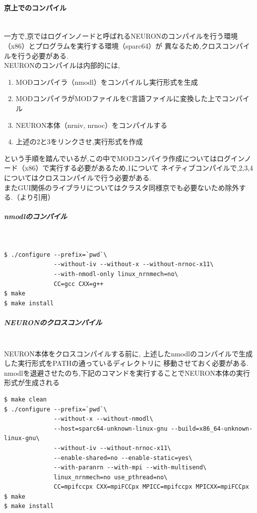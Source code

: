 \paragraph{京上でのコンパイル}~\\
一方で,京ではログインノードと呼ばれるNEURONのコンパイルを行う環境（x86）とプログラムを実行する環境（sparc64）が
異なるため,クロスコンパイルを行う必要がある.\\
NEURONのコンパイルは内部的には,
\begin{enumerate}
\item MODコンパイラ（nmodl）をコンパイルし実行形式を生成
\item MODコンパイラがMODファイルをC言語ファイルに変換した上でコンパイル
\item NEURON本体（nrniv, nrnoc）をコンパイルする
\item 上述の2と3をリンクさせ,実行形式を作成
\end{enumerate}
という手順を踏んでいるが,この中でMODコンパイラ作成についてはログインノード（x86）で実行する必要があるため,1について
ネイティブコンパイルで,2,3,4についてはクロスコンパイルで行う必要がある.\\
またGUI関係のライブラリについてはクラスタ同様京でも必要ないため除外する.（\cite{miyamoto-master}より引用）\\
\subparagraph{nmodlのコンパイル}~\\
{\footnotesize
\begin{lstlisting}[caption=京でのnmodlのコンパイル,label=k-nmodl-compile,numbers=none]
$ ./configure --prefix=`pwd`\
              --without-iv --without-x --without-nrnoc-x11\
              --with-nmodl-only linux_nrnmech=no\
              CC=gcc CXX=g++
$ make
$ make install
\end{lstlisting}
}
\subparagraph{NEURONのクロスコンパイル}~\\
NEURON本体をクロスコンパイルする前に, 上述したnmodlのコンパイルで生成した実行形式をPATHの通っているディレクトリに
移動させておく必要がある. nmodlを退避させたのち,下記のコマンドを実行することでNEURON本体の実行形式が生成される
{\footnotesize
\begin{lstlisting}[caption=京でのNEURON本体のコンパイル,label=k-neuron-compile,numbers=none]
$ make clean
$ ./configure --prefix=`pwd`\
              --without-x --without-nmodl\
              --host=sparc64-unknown-linux-gnu --build=x86_64-unknown-linux-gnu\
              --without-iv --without-nrnoc-x11\
              --enable-shared=no --enable-static=yes\
              --with-paranrn --with-mpi --with-multisend\
              linux_nrnmech=no use_pthread=no\
              CC=mpifccpx CXX=mpiFCCpx MPICC=mpifccpx MPICXX=mpiFCCpx
$ make
$ make install
\end{lstlisting}
}
